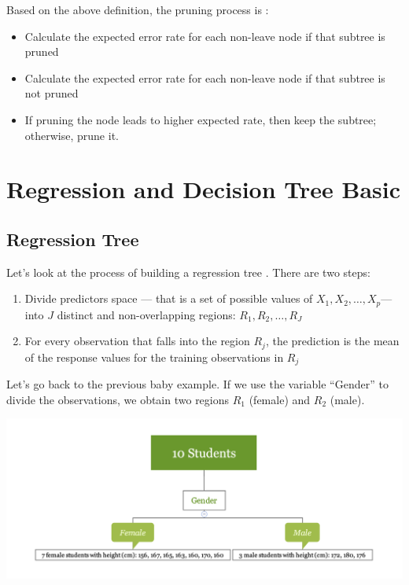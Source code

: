 \documentclass[
  12pt,
]{krantz}
\providecommand{\tightlist}{%
  \setlength{\itemsep}{0pt}\setlength{\parskip}{0pt}}
\begin{document}
Based on the above definition, the pruning process is \citep{Espoito1997}:

\begin{itemize}
\tightlist
\item
  Calculate the expected error rate for each non-leave node if that subtree is pruned
\item
  Calculate the expected error rate for each non-leave node if that subtree is not pruned
\item
  If pruning the node leads to higher expected rate, then keep the subtree; otherwise, prune it.
\end{itemize}

\hypertarget{regression-and-decision-tree-basic}{%
\section{Regression and Decision Tree Basic}\label{regression-and-decision-tree-basic}}

\hypertarget{regression-tree}{%
\subsection{Regression Tree}\label{regression-tree}}

Let's look at the process of building a regression tree \citep{ISLR15}. There are two steps:

\begin{enumerate}
\def\labelenumi{\arabic{enumi}.}
\tightlist
\item
  Divide predictors space --- that is a set of possible values of \(X_1,X_2,\dots,X_p\)--- into \(J\) distinct and non-overlapping regions: \(R_1,R_2,\dots,R_J\)
\item
  For every observation that falls into the region \(R_j\), the prediction is the mean of the response values for the training observations in \(R_j\)
\end{enumerate}

Let's go back to the previous baby example. If we use the variable ``Gender'' to divide the observations, we obtain two regions \(R_1\) (female) and \(R_2\) (male).

\includegraphics{images/varEN.png}
\end{document}

